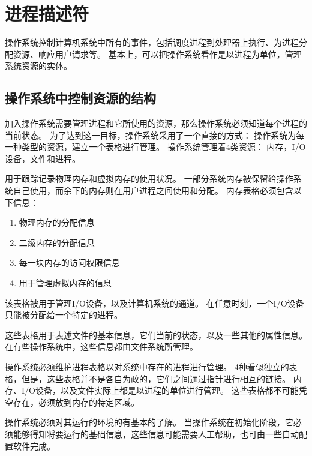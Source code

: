 
\section{进程描述符}
{
    操作系统控制计算机系统中所有的事件，包括调度进程到处理器上执行、为进程分配资源、响应用户请求等。
    基本上，可以把操作系统看作是以进程为单位，管理系统资源的实体。

    \subsection{操作系统中控制资源的结构}
    {
        加入操作系统需要管理进程和它所使用的资源，那么操作系统必须知道每个进程的当前状态。
        为了达到这一目标，操作系统采用了一个直接的方式：
        操作系统为每一种类型的资源，建立一个表格进行管理。
        操作系统管理着4类资源：
        内存，I/O设备，文件和进程。

        {
            用于跟踪记录物理内存和虚拟内存的使用状况。
            一部分系统内存被保留给操作系统自己使用，而余下的内存则在用户进程之间使用和分配。
            内存表格必须包含以下信息：

            \begin{enumerate}
                \item 物理内存的分配信息
                \item 二级内存的分配信息
                \item 每一块内存的访问权限信息
                \item 用于管理虚拟内存的信息
            \end{enumerate}
        }

        {
            该表格被用于管理I/O设备，以及计算机系统的通道。
            在任意时刻，一个I/O设备只能被分配给一个特定的进程。
        }

        {
            这些表格用于表述文件的基本信息，它们当前的状态，以及一些其他的属性信息。
            在有些操作系统中，这些信息都由文件系统所管理。
        }

        {
            操作系统必须维护进程表格以对系统中存在的进程进行管理。
            4种看似独立的表格，但是，这些表格并不是各自为政的，它们之间通过指针进行相互的链接。
            内存、I/O设备，以及文件实际上都是以进程的单位进行管理。
            这些表格都不可能凭空存在，必须放到内存的特定区域。

            操作系统必须对其运行的环境的有基本的了解。
            当操作系统在初始化阶段，它必须能够得知将要运行的基础信息，这些信息可能需要人工帮助，也可由一些自动配置软件完成。
        }
    }

}
